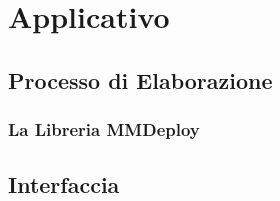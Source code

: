 \chapter{Applicativo}
\section{Processo di Elaborazione}
\subsection{La Libreria MMDeploy}
\section{Interfaccia}